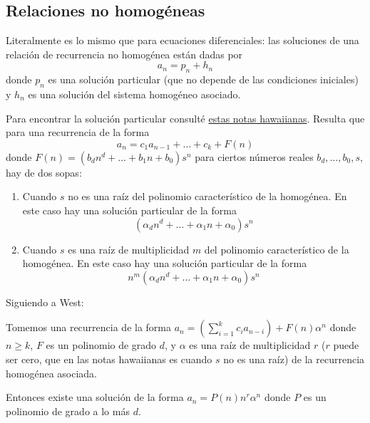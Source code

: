 \documentclass[spanish]{book}
\theoremstyle{definition}
\begin{document}
\subsection{Relaciones no homogéneas}
	Literalmente es lo mismo que para ecuaciones diferenciales: las soluciones de una relación de recurrencia no homogénea están dadas por
	\[a_n=p_n+h_n\]
	donde $p_n$ es una solución particular (que no depende de las condiciones iniciales) y $h_n$ es una solución del sistema homogéneo asociado.
	
	Para encontrar la solución particular consulté \href{https://courses.ics.hawaii.edu/ReviewICS241/morea/counting/RecurrenceRelations2-QA.pdf}{estas notas hawaiianas}. Resulta que para una recurrencia de la forma
	\[a_n=c_1a_{n-1}+\ldots+c_k+F(n)\]
	donde $F(n)=(b_dn^d+\ldots+b_1n+b_0)s^n$ para ciertos números reales $b_d,\ldots,b_0,s$, hay de dos sopas:
	\begin{enumerate}
		\item Cuando $s$ no es una raíz del polinomio característico de la homogénea. En este caso hay una solución particular de la forma
		\[(\alpha_dn^d+\ldots+\alpha_1n+\alpha_0)s^n\]
		
		\item Cuando $s$ es una raíz de multiplicidad $m$ del polinomio característico de la homogénea. En este caso hay una solución particular de la forma
		\[n^m(\alpha_dn^d+\ldots+\alpha_1n+\alpha_0)s^n\]
		
	\end{enumerate}
	
	Siguiendo a West:
	\begin{teo}
		Tomemos una recurrencia de la forma $a_n=(\sum_{i=1}^kc_ia_{n-i})+F(n)\alpha^n$ donde $n\geq k$, $F$ es un polinomio de grado $d$, y $\alpha$ es una raíz de multiplicidad $r$ ($r$ puede ser cero, que en las notas hawaiianas es cuando $s$ no es una raíz) de la recurrencia homogénea asociada.
		
		Entonces existe una solución de la forma $a_n=P(n)n^r\alpha^n$ donde $P$ es un polinomio de grado a lo más $d$.
	\end{teo}
\end{document}
